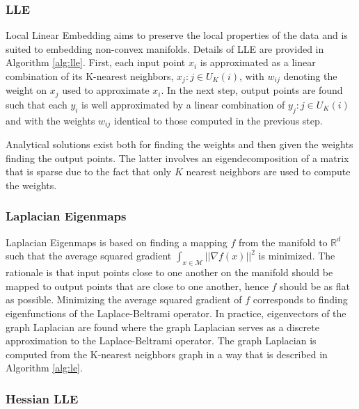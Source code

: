 \documentclass[11pt,a4paper,]{article}
\begin{document}
\hypertarget{lle}{%
\subsubsection*{LLE}\label{lle}}

Local Linear Embedding \autocite[LLE;][]{Roweis2000-ni} aims to preserve the local properties of the data and is suited to embedding non-convex manifolds. Details of LLE are provided in Algorithm \ref{alg:lle}. First, each input point \(x_i\) is approximated as a linear combination of its K-nearest neighbors, \(x_j:j\in U_K(i)\), with \(w_{ij}\) denoting the weight on \(x_j\) used to approximate \(x_i\). In the next step, output points are found such that each \(y_i\) is well approximated by a linear combination of \(y_j:j\in U_K(i)\) and with the weights \(w_{ij}\) identical to those computed in the previous step.

Analytical solutions exist both for finding the weights and then given the weights finding the output points. The latter involves an eigendecomposition of a matrix that is sparse due to the fact that only \(K\) nearest neighbors are used to compute the weights.

\hypertarget{laplacian-eigenmaps}{%
\subsubsection*{Laplacian Eigenmaps}\label{laplacian-eigenmaps}}

Laplacian Eigenmaps \autocite{Belkin2003} is based on finding a mapping \(f\) from the manifold to \(\mathbb{R}^d\) such that the average squared gradient \(\int_{x\in\mathcal{M}}||\nabla f(x)||^2\) is minimized. The rationale is that input points close to one another on the manifold should be mapped to output points that are close to one another, hence \(f\) should be as flat as possible. Minimizing the average squared gradient of \(f\) corresponds to finding eigenfunctions of the Laplace-Beltrami operator. In practice, eigenvectors of the graph Laplacian are found where the graph Laplacian serves as a discrete approximation to the Laplace-Beltrami operator. The graph Laplacian is computed from the K-nearest neighbors graph in a way that is described in Algorithm \ref{alg:le}.

\hypertarget{hessian-lle}{%
\subsubsection*{Hessian LLE}\label{hessian-lle}}
\end{document}
